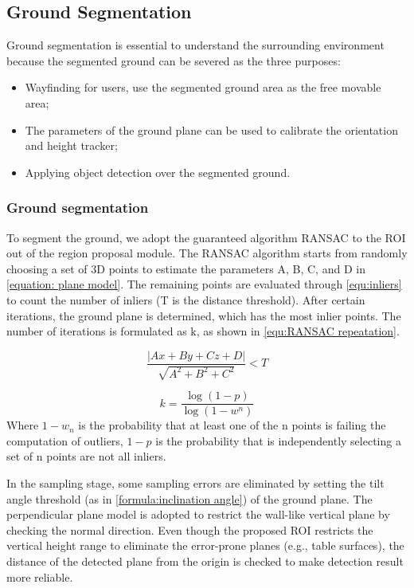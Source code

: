 \documentclass{ieeeaccess}
\begin{document}
\subsection{Ground Segmentation}
Ground segmentation is essential to understand the surrounding environment because the segmented ground can be severed as the three purposes: 

\begin{itemize}
\item Wayfinding for users, use the segmented ground area as the free movable area;
\item The parameters of the ground plane can be used to calibrate the orientation and height tracker;
\item Applying object detection over the segmented ground. 
\end{itemize} 

\subsubsection{Ground segmentation}


To segment the ground, we adopt the guaranteed algorithm RANSAC to the ROI out of the region proposal module. The RANSAC algorithm starts from randomly choosing a set of 3D points to estimate the parameters A, B, C, and D in  \eqref{equation: plane model}. The remaining points are evaluated through \eqref{equ:inliers} to count the number of inliers (T is the distance threshold). After certain iterations, the ground plane is determined, which has the most inlier points. The number of iterations is formulated as k, as shown in \eqref{equ:RANSAC repeatation}.

\begin{equation}
\frac{|Ax+By+Cz+D|}{\sqrt{A^2+B^2+C^2}}<T
\label{equ:inliers}
\end{equation}



\begin{equation}
k=\frac{\log(1-p)}{\log(1-w^n)} 
\label{equ:RANSAC repeatation}
\end{equation}
Where $1-w_n$ is the probability that at least one of the n points is failing the computation of outliers, $1-p$ is the probability that is independently selecting a set of n points are not all inliers. 

In the sampling stage, some sampling errors are eliminated by setting the tilt angle threshold (as in \eqref{formula:inclination angle}) of the ground plane. The perpendicular plane model is adopted to restrict the wall-like vertical plane by checking the normal direction. Even though the proposed ROI restricts the vertical height range to eliminate the error-prone planes (e.g., table surfaces), the distance of the detected plane from the origin is checked to make detection result more reliable. 
\end{document}
